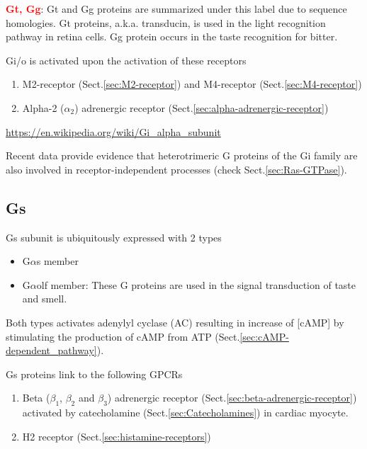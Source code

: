 \begin{mdframed}

\textcolor{red}{\bf Gt, Gg}: Gt and Gg proteins are summarized under this label
due to sequence homologies.
Gt proteins, a.k.a. transducin, is used in the light recognition pathway in
retina cells. Gg protein occurs in the taste recognition for bitter.

\end{mdframed}

Gi/o is activated upon the activation of these receptors  
\begin{enumerate}
  \item M2-receptor (Sect.\ref{sec:M2-receptor}) and M4-receptor
  (Sect.\ref{sec:M4-receptor})
  
  \item Alpha-2 ($\alpha_2$) adrenergic receptor (Sect.\ref{sec:alpha-adrenergic-receptor}) 
\end{enumerate}
\url{https://en.wikipedia.org/wiki/Gi_alpha_subunit}

Recent data provide evidence that heterotrimeric G proteins of the Gi family are
also involved in receptor-independent processes (check
Sect.\ref{sec:Ras-GTPase}).




\subsection{Gs}
\label{sec:Gs-protein}
\label{sec:Golf-protein}

Gs subunit is ubiquitously expressed with 2 types
\begin{itemize}
  \item G$\alpha$s member
  
  \item G$\alpha$olf member: These G proteins are used in the signal transduction of taste and smell.
  
\end{itemize}

Both types activates adenylyl cyclase (AC) resulting in increase of [cAMP] by
stimulating the production of cAMP from ATP (Sect.\ref{sec:cAMP-dependent_pathway}).


Gs proteins link to the following GPCRs
\begin{enumerate}
  \item Beta ($\beta_1$, $\beta_2$ and $\beta_3$) adrenergic receptor
  (Sect.\ref{sec:beta-adrenergic-receptor}) activated by catecholamine
  (Sect.\ref{sec:Catecholamines}) in cardiac myocyte.
  
  \item H2 receptor (Sect.\ref{sec:histamine-receptors})
\end{enumerate}

